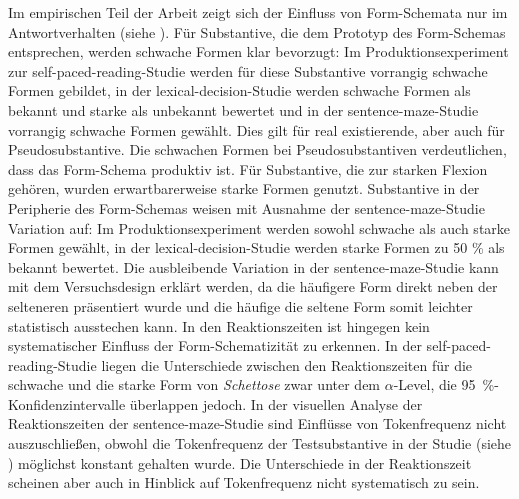 Im empirischen Teil der Arbeit zeigt sich der Einfluss von Form-Schemata nur im Antwortverhalten (siehe ). Für Substantive, die dem Prototyp des Form-Schemas entsprechen, werden schwache Formen klar bevorzugt: Im Produktionsexperiment zur self-paced-reading-Studie werden für diese Substantive vorrangig schwache Formen gebildet, in der lexical-decision-Studie werden schwache Formen als bekannt und starke als unbekannt bewertet und in der sentence-maze-Studie vorrangig schwache Formen gewählt. Dies gilt für real existierende, aber auch für Pseudosubstantive. Die schwachen Formen bei Pseudosubstantiven verdeutlichen, dass das Form-Schema produktiv ist. Für Substantive, die zur starken Flexion gehören, wurden erwartbarerweise starke Formen genutzt. Substantive in der Peripherie des Form-Schemas weisen mit Ausnahme der sentence-maze-Studie Variation auf: Im Produktionsexperiment werden sowohl schwache als auch starke Formen gewählt, in der lexical-decision-Studie werden starke Formen zu 50 \% als bekannt bewertet. Die ausbleibende Variation in der sentence-maze-Studie kann mit dem Versuchsdesign erklärt werden, da die häufigere Form direkt neben der selteneren präsentiert wurde und die häufige die seltene Form somit leichter statistisch ausstechen kann. In den Reaktionszeiten ist hingegen kein systematischer Einfluss der Form-Schematizität zu erkennen. In der self-paced-reading-Studie liegen die Unterschiede zwischen den Reaktionszeiten für die schwache und die starke Form von \textit{Schettose} zwar unter dem $\alpha$-Level, die 95~\%-Konfidenzintervalle überlappen jedoch. In der visuellen Analyse der Reaktionszeiten der sentence-maze-Studie sind Einflüsse von Tokenfrequenz nicht auszuschließen, obwohl die Tokenfrequenz der Testsubstantive in der Studie (siehe ) möglichst konstant gehalten wurde. Die Unterschiede in der Reaktionszeit scheinen aber auch in Hinblick auf Tokenfrequenz nicht systematisch zu sein.

